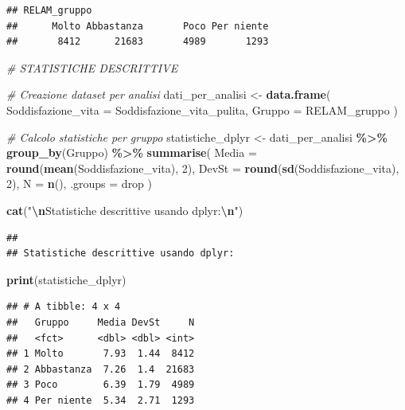 \documentclass[
]{article}
\newenvironment{Shaded}{\begin{snugshade}}{\end{snugshade}}
\newcommand{\AttributeTok}[1]{\textcolor[rgb]{0.13,0.29,0.53}{#1}}
\newcommand{\CommentTok}[1]{\textcolor[rgb]{0.56,0.35,0.01}{\textit{#1}}}
\newcommand{\DecValTok}[1]{\textcolor[rgb]{0.00,0.00,0.81}{#1}}
\newcommand{\FunctionTok}[1]{\textcolor[rgb]{0.13,0.29,0.53}{\textbf{#1}}}
\newcommand{\NormalTok}[1]{#1}
\newcommand{\OtherTok}[1]{\textcolor[rgb]{0.56,0.35,0.01}{#1}}
\newcommand{\SpecialCharTok}[1]{\textcolor[rgb]{0.81,0.36,0.00}{\textbf{#1}}}
\newcommand{\StringTok}[1]{\textcolor[rgb]{0.31,0.60,0.02}{#1}}
\begin{document}
\begin{verbatim}
## RELAM_gruppo
##      Molto Abbastanza       Poco Per niente 
##       8412      21683       4989       1293
\end{verbatim}

\begin{Shaded}
\begin{Highlighting}[]
\CommentTok{\# STATISTICHE DESCRITTIVE}

\CommentTok{\# Creazione dataset per analisi}
\NormalTok{dati\_per\_analisi }\OtherTok{\textless{}{-}} \FunctionTok{data.frame}\NormalTok{(}
  \AttributeTok{Soddisfazione\_vita =}\NormalTok{ Soddisfazione\_vita\_pulita,}
  \AttributeTok{Gruppo =}\NormalTok{ RELAM\_gruppo}
\NormalTok{)}

\CommentTok{\# Calcolo statistiche per gruppo}
\NormalTok{statistiche\_dplyr }\OtherTok{\textless{}{-}}\NormalTok{ dati\_per\_analisi }\SpecialCharTok{\%\textgreater{}\%}
  \FunctionTok{group\_by}\NormalTok{(Gruppo) }\SpecialCharTok{\%\textgreater{}\%}
  \FunctionTok{summarise}\NormalTok{(}
    \AttributeTok{Media =} \FunctionTok{round}\NormalTok{(}\FunctionTok{mean}\NormalTok{(Soddisfazione\_vita), }\DecValTok{2}\NormalTok{),}
    \AttributeTok{DevSt =} \FunctionTok{round}\NormalTok{(}\FunctionTok{sd}\NormalTok{(Soddisfazione\_vita), }\DecValTok{2}\NormalTok{),}
    \AttributeTok{N =} \FunctionTok{n}\NormalTok{(),}
    \AttributeTok{.groups =} \StringTok{\textquotesingle{}drop\textquotesingle{}}
\NormalTok{  )}

\FunctionTok{cat}\NormalTok{(}\StringTok{"}\SpecialCharTok{\textbackslash{}n}\StringTok{Statistiche descrittive usando dplyr:}\SpecialCharTok{\textbackslash{}n}\StringTok{"}\NormalTok{)}
\end{Highlighting}
\end{Shaded}

\begin{verbatim}
## 
## Statistiche descrittive usando dplyr:
\end{verbatim}

\begin{Shaded}
\begin{Highlighting}[]
\FunctionTok{print}\NormalTok{(statistiche\_dplyr)}
\end{Highlighting}
\end{Shaded}

\begin{verbatim}
## # A tibble: 4 x 4
##   Gruppo     Media DevSt     N
##   <fct>      <dbl> <dbl> <int>
## 1 Molto       7.93  1.44  8412
## 2 Abbastanza  7.26  1.4  21683
## 3 Poco        6.39  1.79  4989
## 4 Per niente  5.34  2.71  1293
\end{verbatim}
\end{document}
